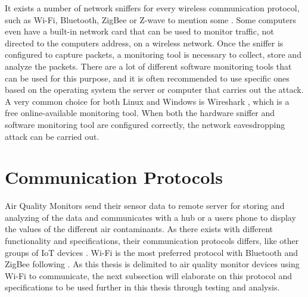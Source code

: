 It exists a number of network sniffers for every wireless communication protocol, such as \gls{Wi-Fi}, Bluetooth, ZigBee or Z-wave to mention some \cite{Sniffingtech}. Some computers even have a built-in network card that can be used to monitor traffic, not directed to the computers address, on a wireless network. Once the sniffer is configured to capture packets, a monitoring tool is necessary to collect, store and analyze the packets. There are a lot of different software monitoring tools that can be used for this purpose, and it is often recommended to use specific ones based on the operating system the server or computer that carries out the attack. A very common choice for both Linux and Windows is Wireshark \cite{Wireshark}, which is a free online-available monitoring tool. When both the hardware sniffer and software monitoring tool are configured correctly, the network eavesdropping attack can be carried out. 

\section{Communication Protocols}
Air Quality Monitors send their sensor data to remote server for storing and analyzing of the data and communicates with a hub or a users phone to display the values of the different air contaminants. As there exists with different functionality and specifications, their communication protocols differs, like other groups of \gls{IoT} devices \cite{AQMBigSource}. \gls{Wi-Fi} is the most preferred protocol with Bluetooth and ZigBee following \cite{saini2020indoor}. As this thesis is delimited to air quality monitor devices using \gls{Wi-Fi} to communicate, the next subsection will elaborate on this protocol and specifications to be used further in this thesis through testing and analysis. 

